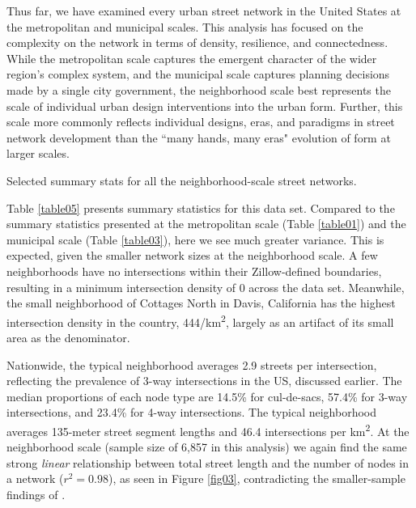 \documentclass{article}
\begin{document}
Thus far, we have examined every urban street network in the United States at the metropolitan and municipal scales. This analysis has focused on the complexity on the network in terms of density, resilience, and connectedness. While the metropolitan scale captures the emergent character of the wider region's complex system, and the municipal scale captures planning decisions made by a single city government, the neighborhood scale best represents the scale of individual urban design interventions into the urban form. Further, this scale more commonly reflects individual designs, eras, and paradigms in street network development than the ``many hands, many eras" evolution of form at larger scales.

\begin{table}[hp]
\caption{Selected summary stats for all the neighborhood-scale street networks.}
\label{table05}
\end{table}

Table \ref{table05} presents summary statistics for this data set. Compared to the summary statistics presented at the metropolitan scale (Table \ref{table01}) and the municipal scale (Table \ref{table03}), here we see much greater variance. This is expected, given the smaller network sizes at the neighborhood scale. A few neighborhoods have no intersections within their Zillow-defined boundaries, resulting in a minimum intersection density of 0 across the data set. Meanwhile, the small neighborhood of Cottages North in Davis, California has the highest intersection density in the country, 444/km\textsuperscript{2}, largely as an artifact of its small area as the denominator. 

Nationwide, the typical neighborhood averages 2.9 streets per intersection, reflecting the prevalence of 3-way intersections in the US, discussed earlier. The median proportions of each node type are 14.5\% for cul-de-sacs, 57.4\% for 3-way intersections, and 23.4\% for 4-way intersections. The typical neighborhood averages 135-meter street segment lengths and 46.4 intersections per km\textsuperscript{2}. At the neighborhood scale (sample size of 6,857 in this analysis) we again find the same strong \emph{linear} relationship between total street length and the number of nodes in a network ($r^{2}=0.98$), as seen in Figure \ref{fig03}, contradicting the smaller-sample findings of \citet{strano_urban_2013}.
\end{document}
